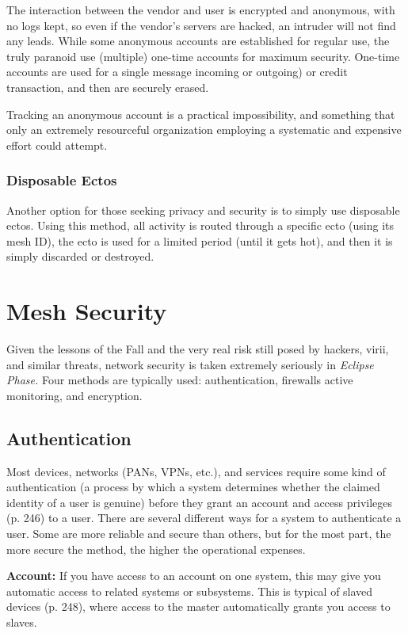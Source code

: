 The interaction between the vendor and user is 
encrypted and anonymous, with no logs kept, so even 
if the vendor's servers are hacked, an intruder will 
not find any leads. While some anonymous accounts 
are established for regular use, the truly paranoid use 
(multiple) one-time accounts for maximum security. 
One-time accounts are used for a single message incoming
or outgoing) or credit transaction, and then
are securely erased.

Tracking an anonymous account is a practical 
impossibility, and something that only an extremely 
resourceful organization employing a systematic and 
expensive effort could attempt.

\subsubsection{Disposable Ectos}

Another option for those seeking privacy and security
is to simply use disposable ectos. Using this
method, all activity is routed through a specific ecto 
(using its mesh ID), the ecto is used for a limited 
period (until it gets hot), and then it is simply discarded
or destroyed.

\section{Mesh Security}

Given the lessons of the Fall and the very real risk still 
posed by hackers, virii, and similar threats, network 
security is taken extremely seriously in \textit{Eclipse Phase. }
Four methods are typically used: authentication, firewalls
active monitoring, and encryption.

\subsection{Authentication}

Most devices, networks (PANs, VPNs, etc.), and services
require some kind of authentication (a process
by which a system determines whether the claimed 
identity of a user is genuine) before they grant an account
and access privileges (p. 246) to a user. There
are several different ways for a system to authenticate 
a user. Some are more reliable and secure than others, 
but for the most part, the more secure the method, the 
higher the operational expenses.

\textbf{Account:} If you have access to an account on one 
system, this may give you automatic access to related 
systems or subsystems. This is typical of slaved devices 
(p. 248), where access to the master automatically 
grants you access to slaves.

